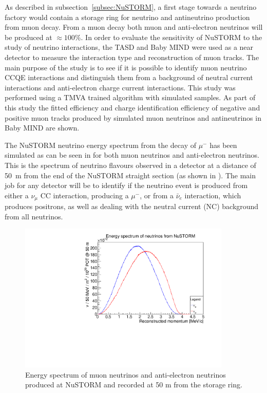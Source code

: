 As described in subsection~\ref{subsec:NuSTORM}, a first stage towards a neutrino factory would contain a storage ring for neutrino and antineutrino production from muon decay. From a muon decay both muon and anti-electron neutrinos will be produced at $\approx 100\%$. In order to evaluate the sensitivity of NuSTORM to the study of neutrino interactions, the TASD and Baby MIND were used as a near detector to measure the interaction type and reconstruction of muon tracks. The main purpose of the study is to see if it is possible to identify muon neutrino CCQE interactions and distinguish them from a background of neutral current interactions and anti-electron charge current interactions. This study was performed using a TMVA trained algorithm with simulated samples. As part of this study the fitted efficiency and charge identification efficiency of negative and positive muon tracks produced by simulated muon neutrinos and antineutrinos in Baby MIND are shown.

The NuSTORM neutrino energy spectrum from the decay of $\mu^-$ has been simulated as can be seen in  for both muon neutrinos and anti-electron neutrinos. This is the spectrum of neutrino flavours observed in a detector at a distance of 50~m from the end of the NuSTORM straight section (as shown in ). The main job for any detector will be to identify if the neutrino event is produced from either a $\nu_\mu$ CC interaction, producing a $\mu^-$, or from a $\bar{\nu}_e$ interaction, which produces positrons, as well as dealing with the neutral current (NC) background from all neutrinos.

\begin{figure}[h!]
\centering
\includegraphics[width=0.9\textwidth]{figures/eSpectrum.pdf}
\caption{Energy spectrum of muon neutrinos and anti-electron neutrinos produced at NuSTORM and recorded at 50 m from the storage ring.}
\label{fig:NuSTORMeSpectrum}
\end{figure}

